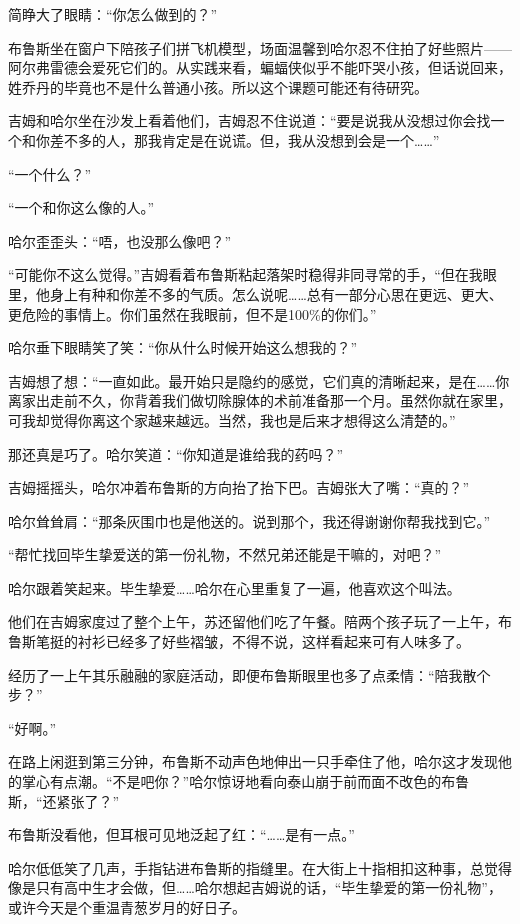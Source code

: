 \documentclass[../main]{subfiles}
\begin{document}
简睁大了眼睛：“你怎么做到的？”

布鲁斯坐在窗户下陪孩子们拼飞机模型，场面温馨到哈尔忍不住拍了好些照片——阿尔弗雷德会爱死它们的。从实践来看，蝙蝠侠似乎不能吓哭小孩，但话说回来，姓乔丹的毕竟也不是什么普通小孩。所以这个课题可能还有待研究。

吉姆和哈尔坐在沙发上看着他们，吉姆忍不住说道：“要是说我从没想过你会找一个和你差不多的人，那我肯定是在说谎。但，我从没想到会是一个\ldots\ldots”

“一个什么？”

“一个和你这么像的人。”

哈尔歪歪头：“唔，也没那么像吧？”

“可能你不这么觉得。”吉姆看着布鲁斯粘起落架时稳得非同寻常的手，“但在我眼里，他身上有种和你差不多的气质。怎么说呢……总有一部分心思在更远、更大、更危险的事情上。你们虽然在我眼前，但不是100\%的你们。”

哈尔垂下眼睛笑了笑：“你从什么时候开始这么想我的？”

吉姆想了想：“一直如此。最开始只是隐约的感觉，它们真的清晰起来，是在……你离家出走前不久，你背着我们做切除腺体的术前准备那一个月。虽然你就在家里，可我却觉得你离这个家越来越远。当然，我也是后来才想得这么清楚的。”

那还真是巧了。哈尔笑道：“你知道是谁给我的药吗？”

吉姆摇摇头，哈尔冲着布鲁斯的方向抬了抬下巴。吉姆张大了嘴：“真的？”

哈尔耸耸肩：“那条灰围巾也是他送的。说到那个，我还得谢谢你帮我找到它。”

“帮忙找回毕生挚爱送的第一份礼物，不然兄弟还能是干嘛的，对吧？”

哈尔跟着笑起来。毕生挚爱……哈尔在心里重复了一遍，他喜欢这个叫法。

他们在吉姆家度过了整个上午，苏还留他们吃了午餐。陪两个孩子玩了一上午，布鲁斯笔挺的衬衫已经多了好些褶皱，不得不说，这样看起来可有人味多了。

经历了一上午其乐融融的家庭活动，即便布鲁斯眼里也多了点柔情：“陪我散个步？”

“好啊。”

在路上闲逛到第三分钟，布鲁斯不动声色地伸出一只手牵住了他，哈尔这才发现他的掌心有点潮。“不是吧你？”哈尔惊讶地看向泰山崩于前而面不改色的布鲁斯，“还紧张了？”

布鲁斯没看他，但耳根可见地泛起了红：“……是有一点。”

哈尔低低笑了几声，手指钻进布鲁斯的指缝里。在大街上十指相扣这种事，总觉得像是只有高中生才会做，但……哈尔想起吉姆说的话，“毕生挚爱的第一份礼物”，或许今天是个重温青葱岁月的好日子。
\end{document}
